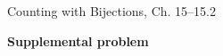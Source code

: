 \documentclass[handout]{mcs}
\begin{document}

\begin{staffnotes}
Counting with Bijections, Ch. 15--15.2
\end{staffnotes}




\begin{center}
\textbf{\large Supplemental problem}
\end{center}


\end{document}
